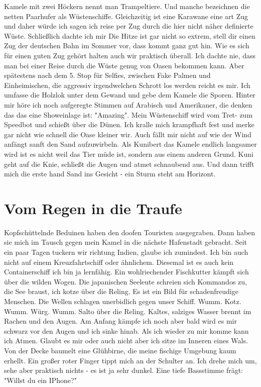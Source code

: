 \documentclass[11pt]{article}
\begin{document}
Kamele mit zwei Höckern nennt man Trampeltiere. Und manche
bezeichnen die netten Paarhufer als Wüstenschiffe. Gleichzeitig ist
eine Karawane eine art Zug und daher würde ich sagen ich reise per
Zug durch die hier nicht näher definierte Wüste.  Schließlich dachte
ich mir Die Hitze ist gar nicht so extrem, stell dir einen Zug der
deutschen Bahn im Sommer vor, dass kommt ganz gut hin. Wie es sich
für einen guten Zug gehört halten auch wir praktisch überall. Ich
dachte nie, dass man bei einer Reise durch die Wüste genug von Oasen
bekommen kann. Aber spätestens nach dem 5. Stop für Selfies,
zwischen Fake Palmen und Einheimischen, die aggressiv irgendwelchen
Schrott los werden reicht es mir. Ich umfasse die Holzlok unter dem
Gewand und gebe dem Kamele die Sporen. Hinter mir höre ich noch
aufgeregte Stimmen auf Arabisch und Amerikaner, die denken das das
eine Showeinlage ist: "Amazing". Mein Wüstenschiff wird vom Tret-
zum Speedbot und schießt über die Dünen. Ich kralle mich krampfhaft
fest und merke gar nicht wie schnell die Oase kleiner wir. Auch
fällt mir nicht auf wie der Wind anfängt sanft den Sand
aufzuwirbeln. Als Kunibert das Kamele endlich langsamer wird ist es
nicht weil das Tier müde ist, sondern aus einem anderen Grund. Kuni
geht auf die Knie, schließt die Augen und atmet schnaubend aus. Und
dann trifft mich die erste hand Sand ins Gesicht - ein Sturm steht
am Horizont.
\section{Vom Regen in die Traufe}
\label{sec:orgef34ab0}
Kopfschüttelnde Beduinen haben den doofen Touristen
ausgegraben. Dann haben sie mich im Tausch gegen mein Kamel in die
nächste Hafenstadt gebracht. Seit ein paar Tagen tuckern wir
richtung Indien, glaube ich zumindest. Ich bin auch nicht auf einem
Kreuzfahrtschiff oder ähnlichem. Diesemal ist es auch kein
Containerschiff ich bin ja lernfähig. Ein wohlriechender Fischkutter
kämpft sich über die wilden Wogen. Die japanischen Seeleute schreien
sich Kommandos zu, die See braust, ich kotze über die Reling. Es ist
ein Bild für schadenfreudige Menschen. Die Wellen schlagen
unerbidlich gegen unser Schiff. Wumm. Kotz. Wumm. Würg. Wumm. Salto
über die Reling. Kaltes, salziges Wasser brennt im Rachen und den
Augen. Am Anfang kämpfe ich noch aber bald wird es mir schwarz vor
den Augen und ich sinke hinab. Als ich wieder zu mir komme kann ich
Atmen. Glaubt es mir oder auch nicht aber ich sitze im Inneren eines
Wals. Von der Decke baumelt eine Glühbirne, die meine fischige
Umgebung kaum erhellt. Ein großer roter Finger tippt mich an der
Schulter an. Ich drehe mich um, sehe aber praktisch nichts - es ist
ja sehr dunkel. Eine tiefe Bassstimme frägt: "Willst du ein IPhone?"
\end{document}
